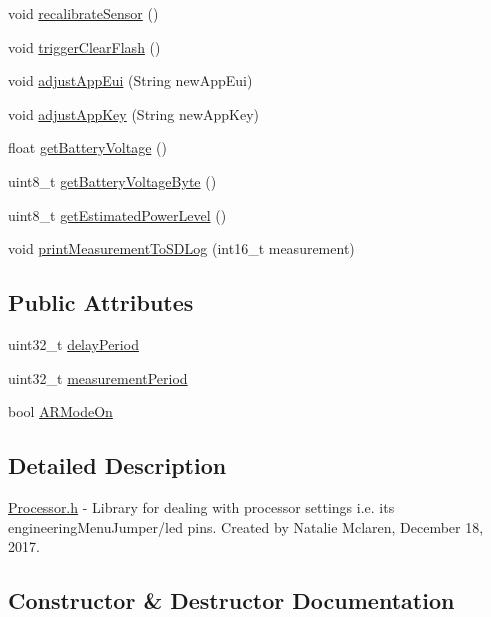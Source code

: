 \begin{DoxyCompactItemize}
void \mbox{\hyperlink{class_processor_ae18acf2c55d0a3bcd7412f86d388808d}{recalibrate\+Sensor}} ()
\item 
void \mbox{\hyperlink{class_processor_a8083069e032fcd6e38c97cc31475200a}{trigger\+Clear\+Flash}} ()
\item 
void \mbox{\hyperlink{class_processor_a9e5c642ce356b8aebe5998158f31ded5}{adjust\+App\+Eui}} (String new\+App\+Eui)
\item 
void \mbox{\hyperlink{class_processor_adee07912124face3700bc988606b8f38}{adjust\+App\+Key}} (String new\+App\+Key)
\item 
float \mbox{\hyperlink{class_processor_aa467c82cb9a57d597487fc319c878c36}{get\+Battery\+Voltage}} ()
\item 
uint8\+\_\+t \mbox{\hyperlink{class_processor_ae2385e41f86895199fb37e524a3f1e86}{get\+Battery\+Voltage\+Byte}} ()
\item 
uint8\+\_\+t \mbox{\hyperlink{class_processor_a78b74d3be91182a263f77ff0f250408d}{get\+Estimated\+Power\+Level}} ()
\item 
void \mbox{\hyperlink{class_processor_aa60b755d3022b3b0f83f654e2b7e2e1d}{print\+Measurement\+To\+S\+D\+Log}} (int16\+\_\+t measurement)
\end{DoxyCompactItemize}
\subsection*{Public Attributes}
\begin{DoxyCompactItemize}
\item 
uint32\+\_\+t \mbox{\hyperlink{class_processor_a3d4df57c57607d2ed3ad9f2d4ff3e789}{delay\+Period}}
\item 
uint32\+\_\+t \mbox{\hyperlink{class_processor_acd8bba113bac81f4c5695cba7c9dd146}{measurement\+Period}}
\item 
bool \mbox{\hyperlink{class_processor_af51b6b3ce7074068195b5d3eb2442fdb}{A\+R\+Mode\+On}}
\end{DoxyCompactItemize}


\subsection{Detailed Description}
\mbox{\hyperlink{_processor_8h}{Processor.\+h}} -\/ Library for dealing with processor settings i.\+e. its engineering\+Menu\+Jumper/led pins. Created by Natalie Mclaren, December 18, 2017. 

\subsection{Constructor \& Destructor Documentation}
\mbox{\label{class_processor_a7f78050cf9700a4247df15a1eed5f88c}} 
